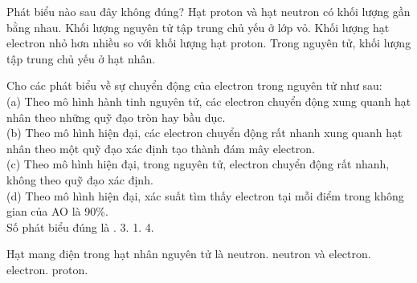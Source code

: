 \documentclass[11pt,a4paper]{article}
\begin{document}
\begin{ex}
Phát biểu nào sau đây không đúng?
\choice
{Hạt proton và hạt neutron có khối lượng gần bằng nhau.}
{\True Khối lượng nguyên tử tập trung chủ yếu ở lớp vỏ.}
{Khối lượng hạt electron nhỏ hơn nhiều so với khối lượng hạt proton.}
{Trong nguyên tử, khối lượng tập trung chủ yếu ở hạt nhân.}

\end{ex}
\begin{ex}
Cho các phát biểu về sự chuyển động của electron trong nguyên tử như sau:\\
(a) Theo mô hình hành tinh nguyên tử, các electron chuyển động xung quanh hạt nhân theo những quỹ đạo tròn hay bầu dục.\\
(b) Theo mô hình hiện đại, các electron chuyển động rất nhanh xung quanh hạt nhân theo một quỹ đạo xác định tạo thành đám mây electron.\\
(c) Theo mô hình hiện đại, trong nguyên tử, electron chuyển động rất nhanh, không theo quỹ đạo xác định.\\
(d) Theo mô hình hiện đại, xác suất tìm thấy electron tại mỗi điểm trong không gian của AO là 90\%.\\
Số phát biểu đúng là
\choice
{.}
{3.}
{1.}
{4.}

\end{ex}
\begin{ex}
Hạt mang điện trong hạt nhân nguyên tử là
\choice
{neutron.}
{neutron và electron.}
{electron.}
{\True proton.}

\end{ex}
\end{document}
